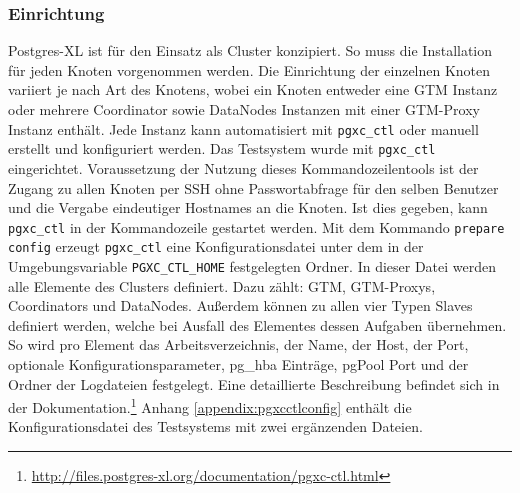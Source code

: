 \subsubsection{Einrichtung}
Postgres-XL ist für den Einsatz als Cluster konzipiert.
So muss die Installation für jeden Knoten vorgenommen werden.
Die Einrichtung der einzelnen Knoten variiert je nach Art des Knotens, wobei ein Knoten entweder eine GTM Instanz oder mehrere Coordinator sowie DataNodes Instanzen mit einer GTM-Proxy Instanz enthält.
Jede Instanz kann automatisiert mit \verb+pgxc_ctl+ oder manuell erstellt und konfiguriert werden.
Das Testsystem wurde mit \verb+pgxc_ctl+ eingerichtet.
Voraussetzung der Nutzung dieses Kommandozeilentools ist der Zugang zu allen Knoten per SSH ohne Passwortabfrage für den selben Benutzer und die Vergabe eindeutiger Hostnames an die Knoten.
Ist dies gegeben, kann \verb+pgxc_ctl+ in der Kommandozeile gestartet werden.
Mit dem Kommando \verb+prepare config+ erzeugt \verb+pgxc_ctl+ eine Konfigurationsdatei unter dem in der Umgebungsvariable \verb+PGXC_CTL_HOME+ festgelegten Ordner.
In dieser Datei werden alle Elemente des Clusters definiert.
Dazu zählt: GTM, GTM-Proxys, Coordinators und DataNodes.
Außerdem können zu allen vier Typen Slaves definiert werden, welche bei Ausfall des Elementes dessen Aufgaben übernehmen.
So wird pro Element das Arbeitsverzeichnis, der Name, der Host, der Port, optionale Konfigurationsparameter, pg\_{}hba Einträge, pgPool Port und der Ordner der Logdateien festgelegt.
Eine detaillierte Beschreibung befindet sich in der Dokumentation.\footnote{\url{http://files.postgres-xl.org/documentation/pgxc-ctl.html}}
Anhang \ref{appendix:pgxcctlconfig} enthält die Konfigurationsdatei des Testsystems mit zwei ergänzenden Dateien.

